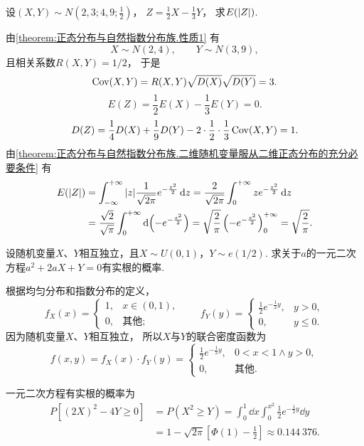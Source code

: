 \begin{example}
设\((X,Y) \sim N\left(2,3;4,9;\frac{1}{2}\right)\)，
\(Z = \frac{1}{2} X - \frac{1}{3} Y\)，
求\(E(\abs{Z})\).
\begin{solution}
由\cref{theorem:正态分布与自然指数分布族.性质1} 有\[
	X \sim N(2,4), \qquad
	Y \sim N(3,9),
\]且相关系数\(R(X,Y) = 1/2\)，
于是\[
	\operatorname{Cov}(X,Y) = R(X,Y) \sqrt{D(X)} \sqrt{D(Y)} = 3.
\]\[
	E(Z) = \frac{1}{2} E(X) - \frac{1}{3} E(Y) = 0.
\]\[
	D(Z) = \frac{1}{4} D(X) + \frac{1}{9} D(Y)
		- 2 \cdot \frac{1}{2} \cdot \frac{1}{3} \operatorname{Cov}(X,Y)
	= 1.
\]
由\cref{theorem:正态分布与自然指数分布族.二维随机变量服从二维正态分布的充分必要条件}
有\begin{align*}
	E(\abs{Z})
	&= \int_{-\infty}^{+\infty} \abs{z} \frac{1}{\sqrt{2\pi}} e^{-\frac{z^2}{2}} \dd{z}
	= \frac{2}{\sqrt{2\pi}} \int_0^{+\infty} z e^{-\frac{z^2}{2}} \dd{z} \\
	&= \frac{\sqrt{2}}{\sqrt{\pi}} \int_0^{+\infty} \dd(-e^{-\frac{z^2}{2}})
	= \sqrt{\frac{2}{\pi}} \left(-e^{-\frac{z^2}{2}}\right)_0^{+\infty}
	= \sqrt{\frac{2}{\pi}}.
\end{align*}
\end{solution}
\end{example}

\begin{example}
设随机变量\(X\)、\(Y\)相互独立，且\(X \sim U(0,1)\)，\(Y \sim e(1/2)\).
求关于\(a\)的一元二次方程\(a^2 + 2aX + Y = 0\)有实根的概率.
\begin{solution}
根据均匀分布和指数分布的定义，\[
	f_X(x) = \left\{ \begin{array}{cl}
		1, & x\in(0,1), \\
		0, & \text{其他};
	\end{array} \right.
	\qquad
	f_Y(y) = \left\{ \begin{array}{cl}
		\frac{1}{2} e^{-\frac{1}{2} y}, & y>0, \\
		0, & y \leq 0.
	\end{array} \right.
\]
因为随机变量\(X\)、\(Y\)相互独立，
所以\(X\)与\(Y\)的联合密度函数为\[
	f(x,y) = f_X(x) \cdot f_Y(y)
	= \left\{ \begin{array}{cl}
		\frac{1}{2} e^{-\frac{1}{2} y}, & 0<x<1 \land y>0, \\
		0, & \text{其他}.
	\end{array} \right.
\]

一元二次方程有实根的概率为\begin{align*}
	P[(2X)^2 - 4Y \geq 0]
	&= P(X^2 \geq Y)
	= \int_0^1 \dd{x} \int_0^{x^2} \frac{1}{2} e^{-\frac{1}{2} y} \dd{y} \\
	&= 1 - \sqrt{2\pi} \left[ \Phi(1) - \frac{1}{2} \right]
	\approx 0.144~376.
\end{align*}
\end{solution}
\end{example}

